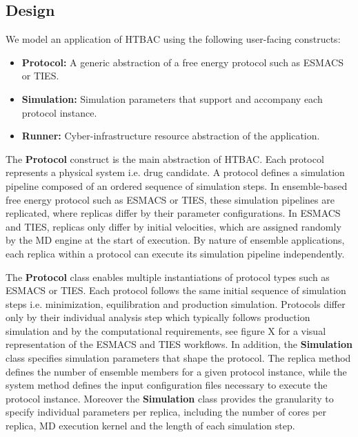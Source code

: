 \subsection{Design}

We model an application of HTBAC using the following user-facing constructs:

\begin{itemize}
  \item \textbf{Protocol:} A generic abstraction of a free energy protocol such
  as ESMACS or TIES. 
  \item \textbf{Simulation:} Simulation parameters that support and accompany 
  each protocol instance. 
  \item \textbf{Runner:} Cyber-infrastructure resource abstraction of the 
  application. 
\end{itemize}

The \textbf{Protocol} construct is the main abstraction of HTBAC. Each protocol
represents a physical system i.e. drug candidate. A protocol defines a
simulation pipeline composed of an ordered sequence of simulation steps. In
ensemble-based free energy protocol such as ESMACS or TIES, these simulation 
pipelines are replicated, where replicas differ by their parameter 
configurations. In ESMACS and TIES, replicas only differ by initial velocities, 
which are assigned randomly by the MD engine at the start of execution. By 
nature of ensemble applications, each replica within a protocol can execute its 
simulation pipeline independently. 

The \textbf{Protocol} class enables multiple instantiations of protocol types
such as ESMACS or TIES. Each protocol follows the same initial sequence of 
simulation steps i.e. minimization, equilibration and production simulation.  
Protocols differ only by their individual analysis step which typically follows 
production simulation and by the computational requirements,  
see figure X for a visual representation of the ESMACS and TIES workflows. 
In addition, the \textbf{Simulation} class specifies simulation parameters that
shape the protocol. The replica method defines the number of ensemble members 
for a given protocol instance, while the system method defines the input
configuration files necessary to execute the protocol instance. Moreover the 
\textbf{Simulation} class provides the granularity to specify individual 
parameters per replica, including the number of cores per replica, MD execution 
kernel and the length of each simulation step.

